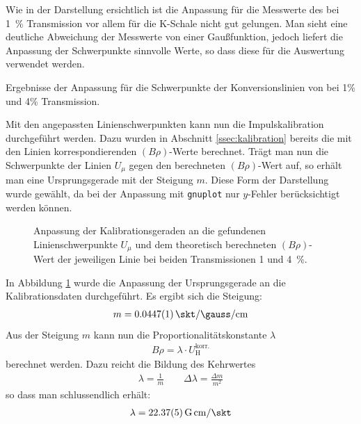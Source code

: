 \documentclass[11pt, a4paper]{article}
\numberwithin{equation}{section}
\begin{document}
Wie in der Darstellung ersichtlich ist die Anpassung für die Messwerte des bei \SI{1}{\percent} Transmission vor allem für die K-Schale nicht gut gelungen.
Man sieht eine deutliche Abweichung der Messwerte von einer Gaußfunktion, jedoch liefert die Anpassung der Schwerpunkte sinnvolle Werte, so dass diese für die Auswertung verwendet werden.
\begin{table}[ht]
	\centering
	
	\caption{Ergebnisse der Anpassung für die Schwerpunkte der Konversionslinien von  bei 1\% und 4\% Transmission.}
	\label{tab:fitergebnisse_ba}
\end{table}
Mit den angepassten Linienschwerpunkten kann nun die Impulskalibration durchgeführt werden.
Dazu wurden in Abschnitt \ref{ssec:kalibration} bereits die mit den Linien korrespondierenden $(B \rho)$-Werte berechnet.
Trägt man nun die Schwerpunkte der Linien $U_\mu$ gegen den berechneten $(B \rho)$-Wert auf, so erhält man eine Ursprungsgerade mit der Steigung $m$.
Diese Form der Darstellung wurde gewählt, da bei der Anpassung mit \texttt{gnuplot} nur $y$-Fehler berücksichtigt werden können.
\begin{figure}[htbp]
	\centering
	
	\caption{Anpassung der Kalibrationsgeraden an die gefundenen Linienschwerpunkte $U_\mu$ und dem theoretisch berechneten $(B \rho)$-Wert der jeweiligen Linie bei beiden Transmissionen \num{1} und \SI{4}{\percent}.}
	\label{fig:kalibration}
\end{figure}
In Abbildung \ref{fig:kalibration} wurde die Anpassung der Ursprungsgerade  an die Kalibrationsdaten durchgeführt.
Es ergibt sich die Steigung:
\begin{align*}
	m = \SI{0.0447 +- 0.0001}{\skt\per \gauss \per \centi\metre}
\end{align*}
Aus der Steigung $m$ kann nun die Proportionalitätskonstante $\lambda$
\begin{align}
	B \rho = \lambda \cdot U_\mathrm{H}^\mathrm{korr.}
\end{align}
berechnet werden.
Dazu reicht die Bildung des Kehrwertes
\begin{align}
	\lambda = \frac{1}{m} \qquad \Delta \lambda = \frac{\Delta m}{m^2}
\end{align}
so dass man schlussendlich erhält:
\begin{align*}
	\lambda = \SI{22.37 +- 0.05}{G.cm\per\skt}
\end{align*}
\end{document}
